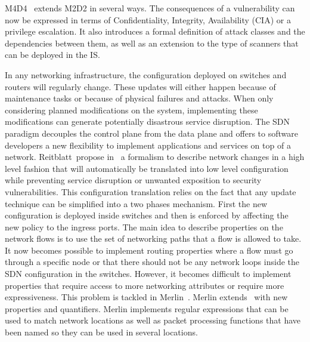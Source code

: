 M4D4~\cite{M4D4-Morin2008} extends M2D2 in several ways. The consequences of a vulnerability can now be expressed in terms of Confidentiality, Integrity, Availability (CIA) or a privilege escalation.
It also introduces a formal definition of attack classes and the dependencies between them, as well as an extension to the type of scanners that can be deployed in the IS.

In any networking infrastructure, the configuration deployed on switches and routers will regularly change. These updates will either happen because of maintenance tasks or because of physical failures and attacks.
When only considering planned modifications on the system, implementing these modifications can generate potentially disastrous service disruption.
The SDN paradigm decouples the control plane from the data plane and offers to software developers a new flexibility to implement applications and services on top of a network.
Reitblatt~\etal propose in~\cite{abstraction-reitblatt2012} a formalism to describe network changes in a high level fashion that will automatically be translated into low level configuration while preventing service disruption or unwanted exposition to security vulnerabilities.
This configuration translation relies on the fact that any update technique can be simplified into a two phases mechanism. First the new configuration is deployed inside switches and then is enforced by affecting the new policy to the ingress ports.
The main idea to describe properties on the network flows is to use the set of networking paths that a flow is allowed to take.
It now becomes possible to implement routing properties where a flow must go through a specific node or that there should not be any network loops inside the SDN configuration in the switches.
However, it becomes difficult to implement properties that require access to more networking attributes or require more expressiveness. This problem is tackled in Merlin~\cite{Merlin-Soule2013}.
Merlin extends~\cite{abstraction-reitblatt2012} with new properties and quantifiers.
Merlin implements regular expressions that can be used to match network locations as well as packet processing functions that have been named so they can be used in several locations.



